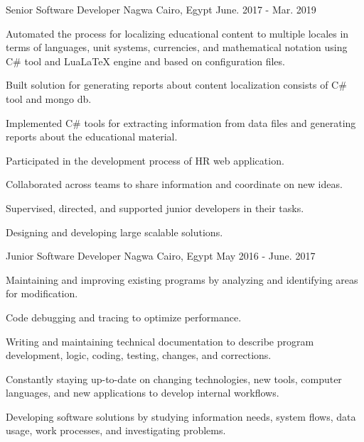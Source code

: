 \begin{cventries}
  \cventry
  {Senior Software Developer} %
  {Nagwa} %
  {Cairo, Egypt} %
  {June. 2017 - Mar. 2019} %
  {
    \begin{cvitems} %
      \item {Automated the process for localizing educational content to multiple locales in terms of languages, unit systems, currencies, and mathematical notation using C\# tool and LuaLaTeX engine and based on configuration files.}
      \item {Built solution for generating reports about content localization consists of C\# tool and mongo db.}
      \item {Implemented C\# tools for extracting information from data files and generating reports about the educational material.}
      \item {Participated in the development process of HR web application.}
      \item {Collaborated across teams to share information and coordinate on new ideas.}
      \item {Supervised, directed, and supported junior developers in their tasks.}
      \item {Designing and developing large scalable solutions.}
    \end{cvitems}
  }
  \cventry
  {Junior Software Developer} %
  {Nagwa} %
  {Cairo, Egypt} %
  {May 2016 - June. 2017} %
  {
    \begin{cvitems} %
      \item {Maintaining and improving existing programs by analyzing and identifying areas for modification.}
      \item {Code debugging and tracing to optimize performance.}
      \item {Writing and maintaining technical documentation to describe program development, logic, coding, testing, changes, and corrections.}
      \item {Constantly staying up-to-date on changing technologies, new tools, computer languages, and new applications to develop internal workflows.}
      \item {Developing software solutions by studying information needs, system flows, data usage, work processes, and investigating problems.}
    \end{cvitems}
  }


\end{cventries}
